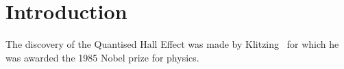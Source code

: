 \documentclass{article}
\begin{document}
 


\section{Introduction}
The discovery of the Quantised Hall Effect was made by
Klitzing~\cite{eff_framework} for which he was awarded the 1985 Nobel
prize for physics.
 
 
\end{document}
